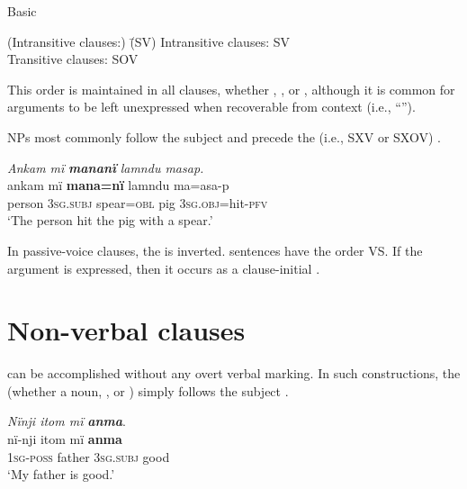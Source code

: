 \ea%
    \label{ex:overview:56}
      Basic \\
\begin{tabbing}
{(Intransitive clauses:)} \= {(SV)}\kill
{Intransitive clauses:} \> {SV}\\
{Transitive clauses:} \> {SOV}
\end{tabbing}
\z

This order is maintained in all  clauses, whether , , or , although it is common for arguments to be left unexpressed when recoverable from context (i.e., “”).

 NPs most commonly follow the subject and precede the  (i.e., SXV or SXOV) .

\ea%
    \label{ex:overview:57}
    \textit{Ankam mï} \textbf{\textit{mananï}} \textit{lamndu masap.}\\
\gll    ankam    mï      \textbf{mana=nï}    lamndu  ma=asa-p\\
    person    3\textsc{sg.subj}  spear=\textsc{obl}    pig      3\textsc{sg.obj}=hit-\textsc{pfv}\\
\glt    ‘The person hit the pig with a spear.’
\z

In  passive-voice clauses, the   is inverted.  sentences have the order VS. If the  argument is expressed, then it occurs as a clause-initial  .

\section{Non-verbal clauses}\label{sec:overview:2.14}


 can be accomplished without any overt verbal marking. In such constructions, the  (whether a noun, , or ) simply follows the subject .

\ea%
    \label{ex:overview:58}
  \textit{Nïnji itom mï} \textbf{\textit{anma}}.\\
\gll    nï-nji     itom  mï      \textbf{anma}\\
    1\textsc{sg-poss}  father  3\textsc{sg.subj}  good\\
\glt    ‘My father is good.’
\z

